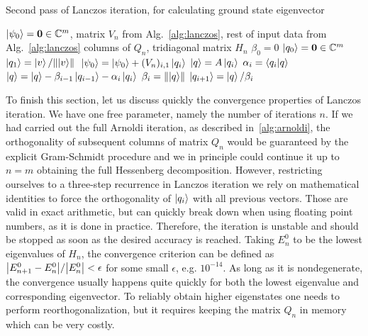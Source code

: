 \begin{algorithm}
	\algrenewcommand{}
	\algrenewcommand{}
	\caption{Second pass of Lanczos iteration, for calculating ground state eigenvector}
	\label{alg:lanczos_second_pass}
	\begin{algorithmic}[1]
		\Require \(\ket{\psi_0} = \vectorbold{0} \in \CC^m\), matrix \(V_n\) from Alg.~\ref{alg:lanczos}, rest of input data from Alg.~\ref{alg:lanczos}
		\Ensure columns of \(Q_n\), tridiagonal matrix \(H_n\)
		\State \(\beta_0 = 0\)
		\State \(\ket{q_0} = \vectorbold{0} \in \CC^m\)
		\State \(\ket{q_1} = \ket{v}/\norm*{\ket{v}}\)
		\State \(\ket{\psi_0} = \ket{\psi_0} + (V_n)_{i,1}\ket{q_i}\) 
		\State \(\ket{q} = A\ket{q_i}\)
		\State \(\alpha_i = \braket{q_i}{q}\)
		\State \(\ket{q} = \ket{q} - \beta_{i-1}\ket{q_{i-1}} - \alpha_i \ket{q_i}\)
		\State \(\beta_i = \norm{\ket{q}} \)
		\State \(\ket{q_{i+1}} = \ket{q}/\beta_i \)
		\EndFor
	\end{algorithmic}
\end{algorithm}

To finish this section, let us discuss quickly the convergence properties of Lanczos iteration. We have one free parameter,
namely the number of iterations \(n\). If we had carried out the full Arnoldi iteration, as described in~\ref{alg:arnoldi},
the orthogonality of subsequent columns of matrix \(Q_n\) would be guaranteed by the explicit Gram-Schmidt procedure
and we in principle could continue it up to \(n = m\) obtaining the full Hessenberg decomposition. However,
restricting ourselves to a three-step recurrence in Lanczos iteration we rely on mathematical identities to
force the orthogonality of \(\ket{q_i}\) with all previous vectors. Those are valid in exact arithmetic, but can
quickly break down when using floating point numbers, as it is done in practice. Therefore, the iteration is unstable and
should be stopped as soon as the desired accuracy is reached. Taking \(E_n^0\) to be the lowest eigenvalues of
\(H_n\), the convergence criterion can be defined as \(\abs{E_{n+1}^0 - E_{n}^0}/\abs{E_n^0} < \epsilon\) for some
small \(\epsilon\), e.g. \(10^{-14}\). As long as it is nondegenerate, the convergence usually happens quite quickly for
both the lowest eigenvalue and corresponding eigenvector. To reliably obtain higher eigenstates one needs to perform
reorthogonalization, but it requires keeping the matrix \(Q_n\) in memory which can be very costly.

